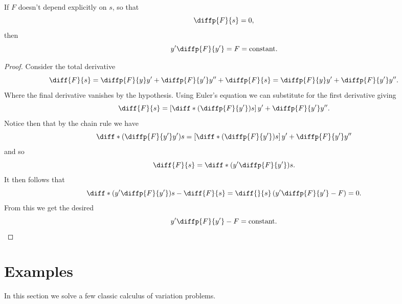 \documentclass[fleqn]{NotesClass}
\begin{document}
    \begin{lma}{}{}
        If \(F\) doesn't depend explicitly on \(s\), so that
        \begin{equation}
            \diffp{F}{s} = 0,
        \end{equation}
        then
        \begin{equation}
            y' \diffp{F}{y'} = F = \text{constant.}
        \end{equation}
        \begin{proof}
            Consider the total derivative
            \begin{equation}
                \diff{F}{s} = \diffp{F}{y}y' + \diffp{F}{y'}y'' + \diffp{F}{s} = \diffp{F}{y}y' + \diffp{F}{y'}y''.
            \end{equation}
            Where the final derivative vanishes by the hypothesis.
            Using Euler's equation we can substitute for the first derivative giving
            \begin{equation}
                \diff{F}{s} = \left[ \diff*{\left( \diffp{F}{y'} \right)}{s} \right]y' + \diffp{F}{y'}y''.
            \end{equation}
            Notice then that by the chain rule we have
            \begin{equation}
                \diff*{\left( \diffp{F}{y'}y' \right)}{s} = \left[ \diff*{\left( \diffp{F}{y'} \right)}{s} \right]y' + \diffp{F}{y'}y''
            \end{equation}
            and so
            \begin{equation}
                \diff{F}{s} = \diff*{\left( y'\diffp{F}{y'} \right)}{s}.
            \end{equation}
            It then follows that
            \begin{equation}
                \diff*{\left( y'\diffp{F}{y'} \right)}{s} - \diff{F}{s} = \diff{}{s}\left( y'\diffp{F}{y'} - F \right) = 0.
            \end{equation}
            From this we get the desired
            \begin{equation}
                y'\diffp{F}{y'} - F = \text{constant.}
            \end{equation}
        \end{proof}
    \end{lma}
    
    \section{Examples}
    In this section we solve a few classic calculus of variation problems.
    
\end{document}
